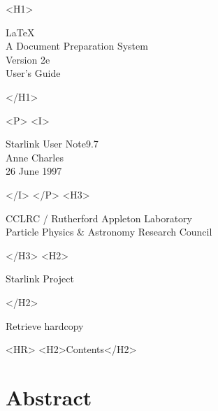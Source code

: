 \documentclass[11pt,twoside]{article}
\newcommand{\stardoccategory}  {Starlink User Note}
\newcommand{\stardocsource}    {sun\stardocnumber}
\newcommand{\stardocnumber}    {9.7}
\newcommand{\stardocauthors}   {Anne Charles}
\newcommand{\stardocdate}      {26 June 1997}
\newcommand{\stardoctitle}     {\LaTeX \\ A Document Preparation System}
\newcommand{\stardocversion}   {Version 2e}
\newcommand{\stardocmanual}    {User's Guide}
\newcommand{\htmladdnormallink}[2]{#1}
\newcommand{\htmladdimg}[1]{}
\newcommand{\htmlref}[2]{#1}
\newcommand{\htmladdtonavigation}[1]{}
\newcommand{\xlabel}[1]{}
\newcommand{\latexonlytoc}[0]{\tableofcontents}
\begin{document}
\begin{htmlonly}
   \xlabel{}
   \begin{rawhtml} <H1> \end{rawhtml}
      \stardoctitle\\
      \stardocversion\\
      \stardocmanual
   \begin{rawhtml} </H1> \end{rawhtml}


   \begin{rawhtml} <P> <I> \end{rawhtml}
   \stardoccategory \stardocnumber \\
   \stardocauthors \\
   \stardocdate
   \begin{rawhtml} </I> </P> <H3> \end{rawhtml}
      \htmladdnormallink{CCLRC}{http://www.cclrc.ac.uk} /
      \htmladdnormallink{Rutherford Appleton Laboratory}
                        {http://www.cclrc.ac.uk/ral} \\
      \htmladdnormallink{Particle Physics \& Astronomy Research Council}
                        {http://www.pparc.ac.uk} \\
   \begin{rawhtml} </H3> <H2> \end{rawhtml}
      \htmladdnormallink{Starlink Project}{http://star-www.rl.ac.uk/}
   \begin{rawhtml} </H2> \end{rawhtml}
   \htmladdnormallink{\htmladdimg{source.gif} Retrieve hardcopy}
      {http://star-www.rl.ac.uk/cgi-bin/hcserver?\stardocsource}\\

  \label{stardoccontents}
  \begin{rawhtml} 
    <HR>
    <H2>Contents</H2>
  \end{rawhtml}
  \renewcommand{\latexonlytoc}[0]{}
  \htmladdtonavigation{\htmlref{\htmladdimg{contents_motif.gif}}
        {stardoccontents}}

  \section{\xlabel{abstract}Abstract}
\end{htmlonly}
\end{document}
